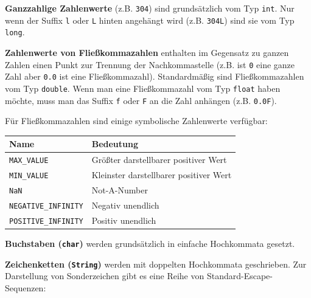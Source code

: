 \begin{description}
\item{\textbf{Ganzzahlige Zahlenwerte}} (z.B. \lstinline|304|) sind
grundsätzlich vom Typ \lstinline|int|. Nur wenn der Suffix \lstinline|l| oder \lstinline|L| hinten
angehängt wird (z.B. \lstinline|304L|) sind sie vom Typ \lstinline|long|.

\item{\textbf{Zahlenwerte von Fließkommazahlen}} enthalten im Gegensatz zu
ganzen Zahlen einen Punkt zur Trennung der Nachkommastelle (z.B. ist \lstinline|0| eine ganze Zahl
aber \lstinline|0.0| ist eine Fließkommazahl). Standardmäßig sind
Fließkommazahlen vom Typ \lstinline|double|. Wenn man eine Fließkommazahl vom
Typ \lstinline|float| haben möchte, muss man das Suffix \lstinline|f| oder
\lstinline|F| an die Zahl anhängen (z.B. \lstinline|0.0F|).

Für Fließkommazahlen sind einige symbolische Zahlenwerte verfügbar:

\begin{tabular}{|l|l|}\hline
\textbf{Name} & \textbf{Bedeutung} \\ \hline
{\lstinline|MAX_VALUE|} & Größter darstellbarer positiver Wert \\ \hline
{\lstinline|MIN_VALUE|} & Kleinster darstellbarer positiver Wert \\ \hline
{\lstinline|NaN|} & Not-A-Number \\ \hline
{\lstinline|NEGATIVE_INFINITY|} & Negativ unendlich \\ \hline
{\lstinline|POSITIVE_INFINITY|} & Positiv unendlich \\ \hline
\end{tabular}

\item{\textbf{Buchstaben (\lstinline|char|)}} werden grundsätzlich in einfache
Hochkommata gesetzt.

\item{\textbf{Zeichenketten (\lstinline|String|)}} werden mit doppelten
Hochkommata geschrieben. Zur Darstellung von Sonderzeichen gibt es eine Reihe
von Standard-Escape-Sequenzen:


\end{description}
